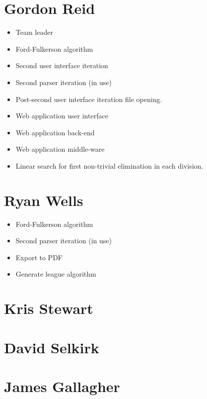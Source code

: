 \section{Gordon Reid}

\begin{itemize}
\item Team leader
\item Ford-Fulkerson algorithm
\item Second user interface iteration
\item Second parser iteration (in use)
\item Post-second user interface iteration file opening.
\item Web application user interface
\item Web application back-end
\item Web application middle-ware
\item Linear search for first non-trivial elimination in each division.
\end{itemize}

\section{Ryan Wells}

\begin{itemize}
\item Ford-Fulkerson algorithm
\item Second parser iteration (in use)
\item Export to PDF
\item Generate league algorithm
\end{itemize}

\section{Kris Stewart}

\section{David Selkirk}

\section{James Gallagher}
